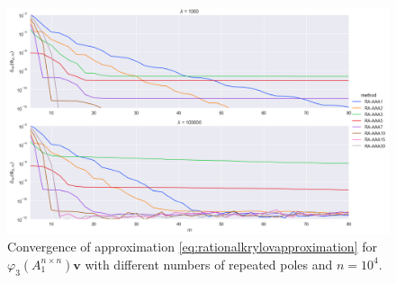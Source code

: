 \begin{figure}[h]
    \centering
    \includegraphics[width=.9\textwidth]{img/krylovapproximation/cnvg_poles_n1e04_p03.png}
    \caption{
        Convergence of approximation \eqref{eq:rationalkrylovapproximation}
        for $\varphi_3(A_1^{n \times n})\mathbf{v}$ with different numbers of repeated poles and $n=10^4$.
    }
    \label{fig:rationalkrylovpoleselection}
\end{figure}

